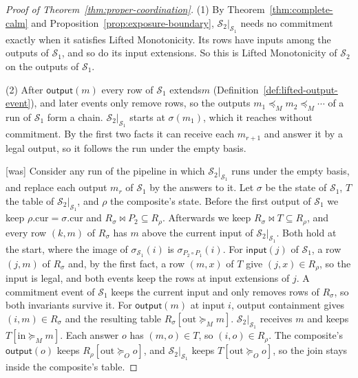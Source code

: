 \documentclass[sigconf]{cidr-2027}
\theoremstyle{remark}
\newcommand{\OutputGe}{\succeq_O}
\newcommand{\commitment}{commitment\xspace}
\newcommand{\indescs}{input extensions\xspace}
\newcommand{\outrel}{extends\xspace}          %
\newcommand{\Spec}{\mathcal{S}}
\begin{document}
\begin{proof}[Proof of Theorem~\ref{thm:proper-coordination}]
(1) By Theorem~\ref{thm:complete-calm} and
Proposition~\ref{prop:exposure-boundary}, $\Spec_2|_{\Spec_1}$ needs no
\commitment exactly when it satisfies Lifted Monotonicity.  Its rows have
inputs among the outputs of $\Spec_1$, and so do its \indescs.  So this is
Lifted Monotonicity of $\Spec_2$ on the outputs of $\Spec_1$.

(2) After $\mathsf{output}(m)$ every row of $\Spec_1$ \outrel $m$
(Definition~\ref{def:lifted-output-event}), and later events only remove rows, so
the outputs
$m_1\preceq_M m_2\preceq_M\cdots$ of a run of $\Spec_1$ form a chain.
$\Spec_2|_{\Spec_1}$ starts at $\sigma(m_1)$, which it reaches without
\commitment.  By the first two facts it can receive each $m_{r+1}$ and answer
it by a legal output, so it follows the run under the empty basis.



{\footnotesize\color{black!50}\noindent\textsf{[was]} Consider any run of the pipeline in which $\Spec_2|_{\Spec_1}$ runs under the
empty basis, and replace each output $m_r$ of $\Spec_1$ by the answers to it.
Let $\sigma$ be the state of $\Spec_1$, $T$ the table of
$\Spec_2|_{\Spec_1}$, and $\rho$ the composite's state.  Before the first
output of $\Spec_1$ we keep $\rho.\mathrm{cur}=\sigma.\mathrm{cur}$ and
$R_\sigma\Join P_2\subseteq R_\rho$.  Afterwards we keep $R_\sigma\Join
T\subseteq R_\rho$, and every row $(k,m)$ of $R_\sigma$ has $m$ above the
current input of $\Spec_2|_{\Spec_1}$.  Both hold at the start, where the
image of $\sigma_{\Spec_1}(i)$ is $\sigma_{P_2\circ P_1}(i)$.  For
$\mathsf{input}(j)$ of $\Spec_1$, a row $(j,m)$ of $R_\sigma$ and, by the first
fact, a row $(m,x)$ of $T$ give $(j,x)\in R_\rho$, so the input is legal, and
both events keep the rows at \indescs of $j$.  A \commitment event of
$\Spec_1$ keeps the current input and only removes rows of $R_\sigma$, so both
invariants survive it.  For $\mathsf{output}(m)$ at input $i$, output
containment gives $(i,m)\in R_\sigma$ and the resulting table
$R_\sigma[\mathrm{out}\succeq_M m]$.  $\Spec_2|_{\Spec_1}$ receives $m$
and keeps $T[\mathrm{in}\succeq_M m]$.  Each answer $o$ has $(m,o)\in T$, so
$(i,o)\in R_\rho$.  The composite's $\mathsf{output}(o)$ keeps
$R_\rho[\mathrm{out}\OutputGe o]$, and $\Spec_2|_{\Spec_1}$ keeps
$T[\mathrm{out}\OutputGe o]$, so the join stays inside the composite's table.\par}


\end{proof}
\end{document}
